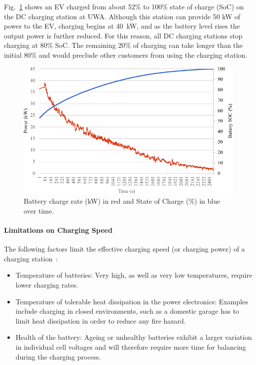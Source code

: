 Fig.~\ref{fig:10:cr} shows an EV charged from about 52\% to 100\% state of charge (SoC) on the DC charging station at UWA. Although this station can provide 50 kW of power to the EV, charging begins at 40~kW, and as the battery level rises the output power is further reduced. For this reason, all DC charging stations stop charging at 80\% SoC. The remaining 20\% of charging can take longer than the initial 80\% and would preclude other customers from using the charging station.

\begin{figure}[H]
	\centering
	\includegraphics[width=0.7\linewidth]{chargerate}
	\caption[Battery charge rate and State of Charge over time.]{Battery charge rate (kW) in red and State of Charge (\%) in blue over time.}
	\label{fig:10:cr}
\end{figure}

\paragraph{Limitations on Charging Speed}
The following factors limit the effective charging speed (or charging power) of a charging station~\cite{zhang_charging_2017}:
\begin{itemize}
	\item Temperature of batteries: Very high, as well as very low temperatures, require lower charging rates.
	\item Temperature of tolerable heat dissipation in the power electronics: Examples include charging in closed environments, such as a domestic garage has to limit heat dissipation in order to reduce any fire hazard.
	\item Health of the battery: Ageing or unhealthy batteries exhibit a larger variation in individual cell voltages and will therefore require more time for balancing during the charging process.
\end{itemize}

